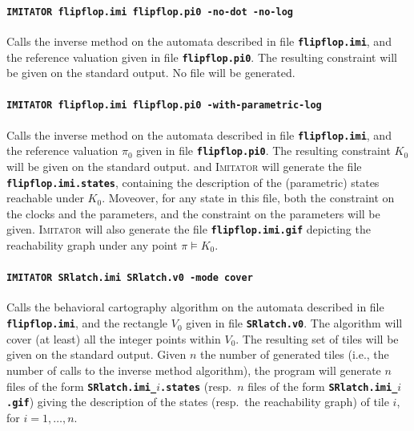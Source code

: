 \documentclass[a4paper,10pt]{article}
\newcommand{\imitator}{\textsc{Imitator}}
\newcommand{\imitatorExec}{\code{IMITATOR}}
\newcommand{\code}[1]{\textbf{\texttt{#1}}}
\begin{document}
\paragraph{\code{\imitatorExec{} flipflop.imi flipflop.pi0 -no-dot -no-log}}
Calls the inverse method on the automata described in file \code{flipflop.imi}, and the reference valuation given in file \code{flipflop.pi0}.
The resulting constraint will be given on the standard output.
No file will be generated.


\paragraph{\code{\imitatorExec{} flipflop.imi flipflop.pi0 -with-parametric-log}}
Calls the inverse method on the automata described in file \code{flipflop.imi}, and the reference valuation $\pi_0$ given in file \code{flipflop.pi0}.
The resulting constraint $K_0$ will be given on the standard output.
and \imitator{} will generate the file \code{flipflop.imi.states}, containing the description of the (parametric) states reachable under $K_0$.
Moveover, for any state in this file, both the constraint on the clocks and the parameters, and the constraint on the parameters will be given.
\imitator{} will also generate the file \code{flipflop.imi.gif} depicting the reachability graph under any point $\pi \models K_0$.

\paragraph{\code{\imitatorExec{} SRlatch.imi SRlatch.v0 -mode cover}}
Calls the behavioral cartography algorithm on the automata described in file \code{flipflop.imi}, and the rectangle $V_0$ given in file \code{SRlatch.v0}.
The algorithm will cover (at least) all the integer points within $V_0$.
The resulting set of tiles will be given on the standard output.
Given $n$ the number of generated tiles (i.e., the number of calls to the inverse method algorithm), the program will generate $n$ files of the form \code{SRlatch.imi\_$i$.states} (resp.~$n$ files of the form \code{SRlatch.imi\_$i$.gif}) giving the description of the states (resp.~the reachability graph) of tile $i$, for $i = 1, \dots, n$.
\end{document}
